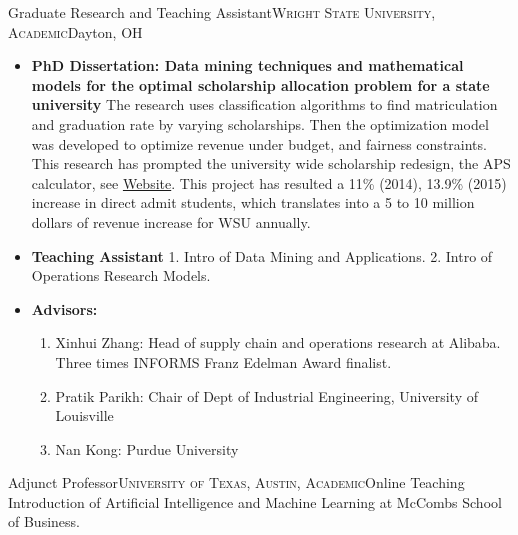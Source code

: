 \documentclass[12pt,a4paper,roman]{moderncv} %
\begin{document}
\bigskip
{} {Graduate Research and Teaching
Assistant}{\textsc{Wright State University, Academic}}{Dayton, OH}{}{
\begin{itemize}
\item \textbf{PhD Dissertation: Data mining techniques and mathematical models for the optimal scholarship allocation problem for a state university}
\newline
The research uses classification algorithms to find
matriculation and graduation rate by varying scholarships. Then the
optimization model was developed to optimize revenue under budget, and fairness constraints.
This research has prompted the university wide scholarship redesign, the APS
calculator, see \href{http://www.wright.edu/raider-connect/financial-aid/first-year-scholarships}{Website}. 
This project has resulted a 11\% (2014), 13.9\% (2015) increase in direct admit
students, which translates into a 5 to 10 million dollars of revenue increase
for WSU annually.
\item \textbf{Teaching Assistant}
1. Intro of Data Mining and Applications. 
2. Intro of Operations Research Models.
\item \textbf{Advisors:}
\begin{enumerate}
\item Xinhui Zhang: Head of supply chain and operations research at Alibaba. Three times INFORMS Franz Edelman Award finalist.
\item Pratik Parikh: Chair of Dept of Industrial Engineering, University of Louisville
\item Nan Kong: Purdue University  
\end{enumerate}
\end{itemize}
 }
 
\bigskip
{} {Adjunct Professor}{\textsc{University of Texas, Austin, Academic}}{Online}{}{
Teaching Introduction of Artificial Intelligence and Machine Learning at McCombs School of Business.}




\end{document}
